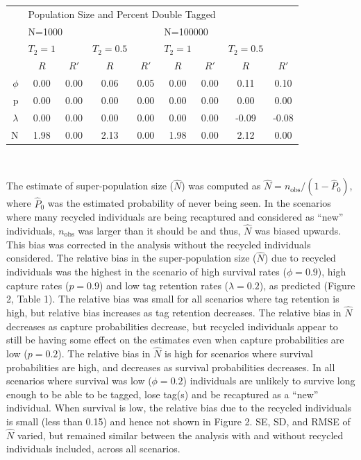 \documentclass[]{article}
\begin{document}
\begin{table}[ht]
\centering
\begin{tabular}{rcccccccc}
  \hline
  & \multicolumn{8}{l}{Population Size and Percent Double Tagged} \\
  \cline{2-9}
  & \multicolumn{4}{l}{N=1000} & \multicolumn{4}{l}{N=100000} \\
  \cline {2-9}
  & $T_2=1$ && $T_2=0.5$ && $T_2=1$ && $T_2=0.5$ &  \\ 
  \cline {2-9}
  & $R$ & $R'$ & $R$ & $R'$ & $R$ & $R'$ & $R$ & $R'$ \\ 
  \hline
$\phi$ & 0.00 & 0.00 & 0.06 & 0.05 & 0.00 & 0.00 & 0.11 & 0.10 \\ 
  p & 0.00 & 0.00 & 0.00 & 0.00 & 0.00 & 0.00 & 0.00 & 0.00 \\ 
  $\lambda$ & 0.00 & 0.00 & 0.00 & 0.00 & 0.00 & 0.00 & -0.09 & -0.08 \\ 
  N & 1.98 & 0.00 & 2.13 & 0.00 & 1.98 & 0.00 & 2.12 & 0.00 \\ 
   \hline
\end{tabular}
\end{table}

~ ~

The estimate of super-population size (\(\hat{N}\)) was computed as
\(\hat{N}=n_{\text{obs}}/{(1-\hat{P}_0)}\), where \(\hat{P}_0\) was the
estimated probability of never being seen. In the scenarios where many
recycled individuals are being recaptured and considered as ``new''
individuals, \(n_{\text{obs}}\) was larger than it should be and thus,
\(\hat{N}\) was biased upwards. This bias was corrected in the analysis
without the recycled individuals considered. The relative bias in the
super-population size (\(\hat{N}\)) due to recycled individuals was the
highest in the scenario of high survival rates (\(\phi=0.9\)), high
capture rates (\(p=0.9\)) and low tag retention rates (\(\lambda=0.2\)),
as predicted (Figure 2, Table 1). The relative bias was small for all
scenarios where tag retention is high, but relative bias increases as
tag retention decreases. The relative bias in \(\hat{N}\) decreases as
capture probabilities decrease, but recycled individuals appear to still
be having some effect on the estimates even when capture probabilities
are low (\(p=0.2\)). The relative bias in \(\hat{N}\) is high for
scenarios where survival probabilities are high, and decreases as
survival probabilities decreases. In all scenarios where survival was
low (\(\phi=0.2\)) individuals are unlikely to survive long enough to be
able to be tagged, lose tag(s) and be recaptured as a ``new''
individual. When survival is low, the relative bias due to the recycled
individuals is small (less than 0.15) and hence not shown in Figure 2.
SE, SD, and RMSE of \(\hat{N}\) varied, but remained similar between the
analysis with and without recycled individuals included, across all
scenarios.
\end{document}
